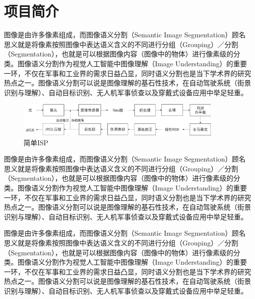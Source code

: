 



\section{项目简介}

图像是由许多像素组成，而图像语义分割（Semantic Image Segmentation）顾名思义就是将像素按照图像中表达语义含义的不同进行分组（Grouping）／分割（Segmentation），也就是可以根据图像内容（图像中的物体）进行像素级的分类。图像语义分割作为视觉人工智能中图像理解（Image Understanding）的重要一环，不仅在军事和工业界的需求日益凸显，同时语义分割也是当下学术界的研究热点之一。图像语义分割可以说是图像理解的基石性技术，在自动驾驶系统（街景识别与理解）、自动目标识别、无人机军事侦查以及穿戴式设备应用中举足轻重。

\begin{figure}[b]
    \centering
    \includegraphics[width=0.9\textwidth]{Img/ISP_simple}
    \caption{简单ISP}
\end{figure}

图像是由许多像素组成，而图像语义分割（Semantic Image Segmentation）顾名思义就是将像素按照图像中表达语义含义的不同进行分组（Grouping）／分割（Segmentation），也就是可以根据图像内容（图像中的物体）进行像素级的分类。图像语义分割作为视觉人工智能中图像理解（Image Understanding）的重要一环，不仅在军事和工业界的需求日益凸显，同时语义分割也是当下学术界的研究热点之一。图像语义分割可以说是图像理解的基石性技术，在自动驾驶系统（街景识别与理解）、自动目标识别、无人机军事侦查以及穿戴式设备应用中举足轻重。

图像是由许多像素组成，而图像语义分割（Semantic Image Segmentation）顾名思义就是将像素按照图像中表达语义含义的不同进行分组（Grouping）／分割（Segmentation），也就是可以根据图像内容（图像中的物体）进行像素级的分类。图像语义分割作为视觉人工智能中图像理解（Image Understanding）的重要一环，不仅在军事和工业界的需求日益凸显，同时语义分割也是当下学术界的研究热点之一。图像语义分割可以说是图像理解的基石性技术，在自动驾驶系统（街景识别与理解）、自动目标识别、无人机军事侦查以及穿戴式设备应用中举足轻重。

